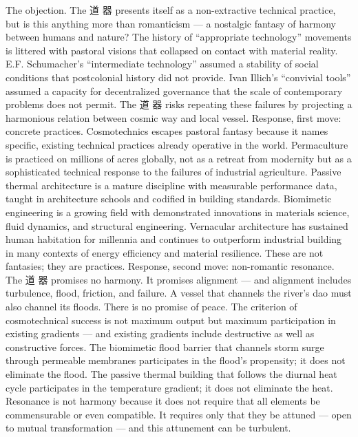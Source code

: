 The objection. The 道 器 presents itself as a non-extractive technical practice, but is this anything more than romanticism — a nostalgic fantasy of harmony between humans and nature? The history of “appropriate technology” movements is littered with pastoral visions that collapsed on contact with material reality. E.F. Schumacher’s “intermediate technology” assumed a stability of social conditions that postcolonial history did not provide. Ivan Illich’s “convivial tools” assumed a capacity for decentralized governance that the scale of contemporary problems does not permit. The 道 器 risks repeating these failures by projecting a harmonious relation between cosmic way and local vessel. Response, first move: concrete practices. Cosmotechnics escapes pastoral fantasy because it names specific, existing technical practices already operative in the world. Permaculture is practiced on millions of acres globally, not as a retreat from modernity but as a sophisticated technical response to the failures of industrial agriculture. Passive thermal architecture is a mature discipline with measurable performance data, taught in architecture schools and codified in building standards. Biomimetic engineering is a growing field with demonstrated innovations in materials science, fluid dynamics, and structural engineering. Vernacular architecture has sustained human habitation for millennia and continues to outperform industrial building in many contexts of energy efficiency and material resilience. These are not fantasies; they are practices. Response, second move: non-romantic resonance. The 道 器 promises no harmony. It promises alignment — and alignment includes turbulence, flood, friction, and failure. A vessel that channels the river’s dao must also channel its floods. There is no promise of peace. The criterion of cosmotechnical success is not maximum output but maximum participation in existing gradients — and existing gradients include destructive as well as constructive forces. The biomimetic flood barrier that channels storm surge through permeable membranes participates in the flood’s propensity; it does not eliminate the flood. The passive thermal building that follows the diurnal heat cycle participates in the temperature gradient; it does not eliminate the heat. Resonance is not harmony because it does not require that all elements be commensurable or even compatible. It requires only that they be attuned — open to mutual transformation — and this attunement can be turbulent.

